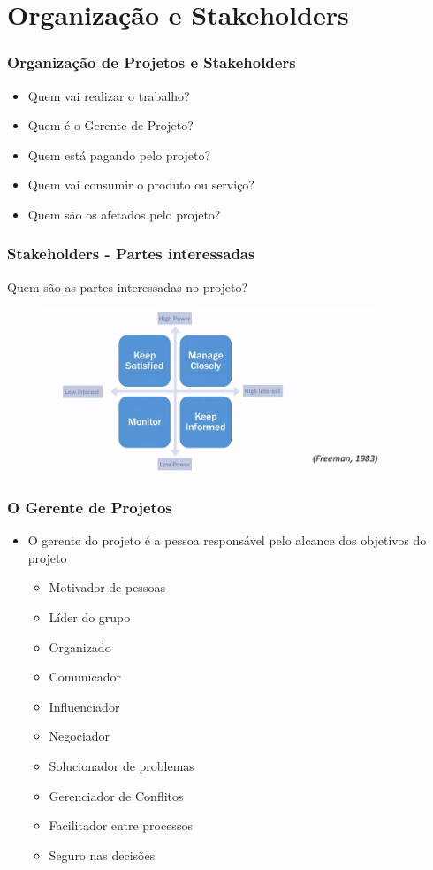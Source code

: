  
  \section{Organização e Stakeholders}
  \begin{frame}
   \frametitle{Organização de Projetos e Stakeholders}
   \begin{itemize}
    \item Quem vai realizar o trabalho?
    \item Quem é o Gerente de Projeto?
    \item Quem está pagando pelo projeto?
    \item Quem vai consumir o produto ou serviço?
    \item Quem são os afetados pelo projeto?
   \end{itemize}
  \end{frame}

  \begin{frame}
   \frametitle{Stakeholders - Partes interessadas}
   Quem são as partes interessadas no projeto?
    \begin{figure}
  \centering
  \includegraphics[width = 0.9\textwidth]{figs/fig_proj8.png}
 \end{figure}
  \end{frame}


  \begin{frame}
   \frametitle{O Gerente de Projetos}
   \begin{itemize}
    \item O gerente do projeto é a pessoa responsável pelo alcance dos objetivos do projeto
    \begin{itemize}
     \item Motivador de pessoas
     \item Líder do grupo
     \item Organizado
     \item Comunicador
     \item Influenciador
     \item Negociador
     \item Solucionador de problemas
     \item Gerenciador de Conflitos
     \item Facilitador entre processos
     \item Seguro nas decisões
    \end{itemize}
   \end{itemize}
  \end{frame}
  
